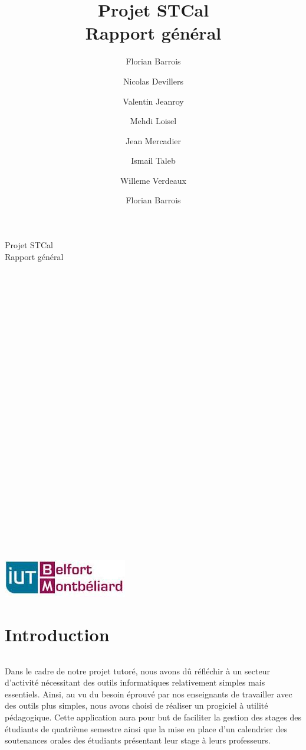\documentclass[a4paper,10pt]{report}
\date{}
\title{\Huge{Projet STCal}\\ {\Large Rapport général}}
\author{Florian Barrois \and Nicolas Devillers \and Valentin Jeanroy \and Mehdi Loisel \and Jean Mercadier \and Ismail Taleb \and Willeme Verdeaux}
\begin{document}
 \begin{titlepage}%

\begin{center}
\Huge
Projet STCal\\
\Large
Rapport général\\
~\\~\\~\\~\\~\\~\\~\\~\\~\\~\\~\\~\\~\\~\\~\\~\\
\author{Florian Barrois}
~\\~\\~\\~\\~\\~\\~\\~\\~\\
\includegraphics{iutbm.jpeg}
\hfill
\end{center}
\end{titlepage}


\strut
\renewcommand{\contentsname}{Sommaire}
\tableofcontents

\part{Introduction}
  \paragraph{}
    Dans le cadre de notre projet tutoré, nous avons dû réfléchir à un secteur d'activité nécessitant des outils informatiques relativement simples mais essentiels. 
    Ainsi, au vu du besoin éprouvé par nos enseignants de travailler avec des outils plus simples, nous avons choisi de réaliser un progiciel à utilité pédagogique.
    Cette application aura pour but de faciliter la gestion des stages des étudiants de quatrième semestre ainsi que la mise en place d'un calendrier des soutenances orales des étudiants présentant leur stage à leurs professeurs.
\end{document}
